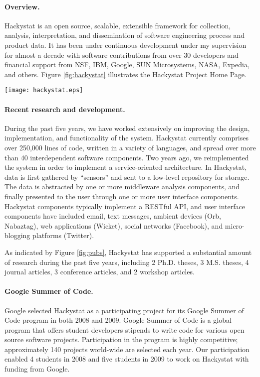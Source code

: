\documentclass[11pt]{article}
\begin{document}
\paragraph{Overview.} Hackystat is an open source, scalable, extensible
framework for collection, analysis, interpretation, and dissemination of
software engineering process and product data.  It has been under
continuous development under my supervision for almost a decade with
software contributions from over 30 developers and financial support from
NSF, IBM, Google, SUN Microsystems, NASA, Expedia, and others.  Figure
\ref{fig:hackystat} illustrates the Hackystat Project Home Page.


\begin{figure*}[ht]
  \center
  \texttt{[image: hackystat.eps]}
  \caption{The Hackystat Project Home Page}
  \label{fig:hackystat}
\end{figure*} 

\paragraph{Recent research and development.} During the past five years, we
have worked extensively on improving the design, implementation, and
functionality of the system.  Hackystat currently comprises over 250,000
lines of code, written in a variety of languages, and spread over more than
40 interdependent software components.  Two years ago, we reimplemented the
system in order to implement a service-oriented architecture.  In
Hackystat, data is first gathered by ``sensors'' and sent to a low-level
repository for storage.  The data is abstracted by one or more middleware
analysis components, and finally presented to the user through one or more
user interface components.  Hackystat components typically implement a
RESTful API, and user interface components have included email, text
messages, ambient devices (Orb, Nabaztag), web applications (Wicket),
social networks (Facebook), and micro-blogging platforms (Twitter).

As indicated by Figure \ref{fig:pubs}, Hackystat has supported a
substantial amount of research during the past five years, including 2
Ph.D. theses, 3 M.S. theses, 4 journal articles, 3 conference articles, and
2 workshop articles.

\paragraph{Google Summer of Code.} Google selected Hackystat as a
participating project for its Google Summer of Code program in both 2008
and 2009.  Google Summer of Code is a global program that offers student
developers stipends to write code for various open source software
projects.  Participation in the program is highly competitive;
approximately 140 projects world-wide are selected each year.  Our
participation enabled 4 students in 2008 and five students in 2009 to work
on Hackystat with funding from Google.
\end{document}
